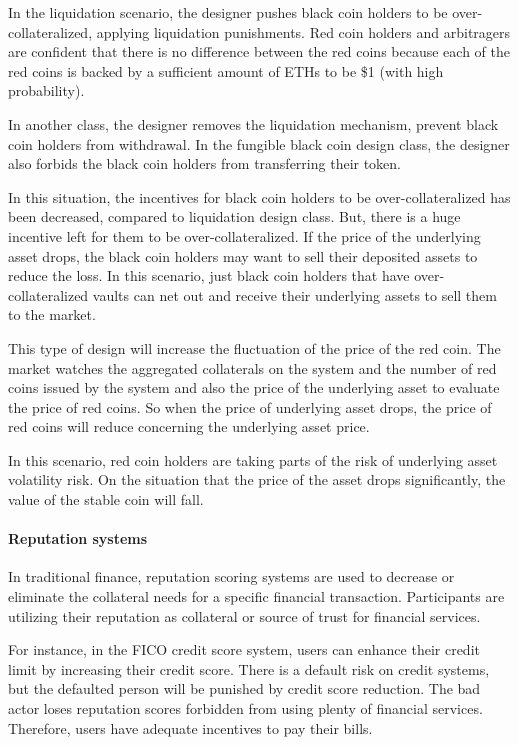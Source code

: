 \documentclass[runningheads]{llncs}
\begin{document}
In the liquidation scenario, the designer pushes black coin holders to be over-collateralized, applying liquidation punishments. Red coin holders and arbitragers are confident that there is no difference between the red coins because each of the red coins is backed by a sufficient amount of ETHs to be \$1 (with high probability).

In another class, the designer removes the liquidation mechanism, prevent black coin holders from withdrawal. In the fungible black coin design class, the designer also forbids the black coin holders from transferring their token. 

In this situation, the incentives for black coin holders to be over-collateralized has been decreased, compared to liquidation design class. But, there is a huge incentive left for them to be over-collateralized. If the price of the underlying asset drops, the black coin holders may want to sell their deposited assets to reduce the loss. In this scenario, just black coin holders that have over-collateralized vaults can net out and receive their underlying assets to sell them to the market.

This type of design will increase the fluctuation of the price of the red coin. The market watches the aggregated collaterals on the system and the number of red coins issued by the system and also the price of the underlying asset to evaluate the price of red coins. So when the price of underlying asset drops, the price of red coins will reduce concerning the underlying asset price. 

In this scenario, red coin holders are taking parts of the risk of underlying asset volatility risk. On the situation that the price of the asset drops significantly, the value of the stable coin will fall.

\paragraph{Reputation systems}

In traditional finance, reputation scoring systems are used to decrease or eliminate the collateral needs for a specific financial transaction. Participants are utilizing their reputation as collateral or source of trust for financial services. 

For instance, in the FICO credit score system, users can enhance their credit limit by increasing their credit score. There is a default risk on credit systems, but the defaulted person will be punished by credit score reduction. The bad actor loses reputation scores forbidden from using plenty of financial services. Therefore, users have adequate incentives to pay their bills.
\end{document}
